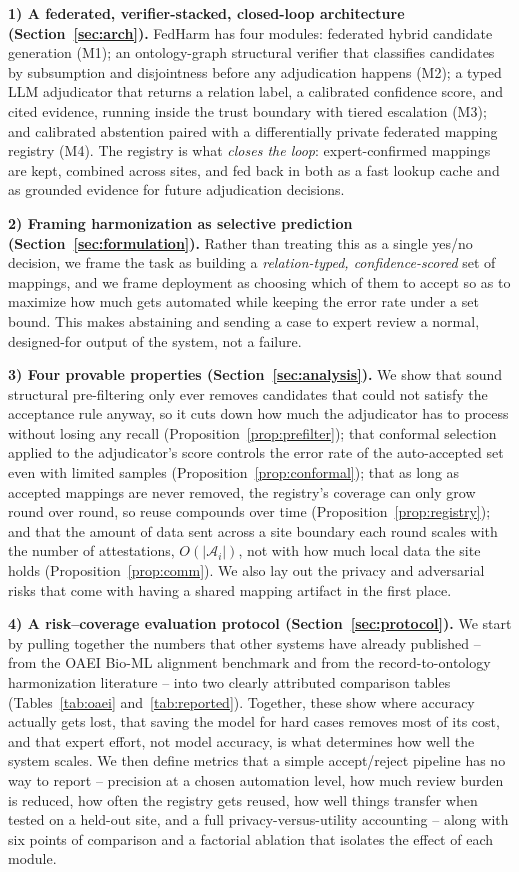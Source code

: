 \documentclass[conference]{IEEEtran}
\newcommand{\att}{\mathcal{A}}
\begin{document}
\textbf{1) A federated, verifier-stacked, closed-loop architecture (Section~\ref{sec:arch}).} FedHarm has four modules: federated hybrid candidate generation (M1); an ontology-graph structural verifier that classifies candidates by subsumption and disjointness before any adjudication happens (M2); a typed LLM adjudicator that returns a relation label, a calibrated confidence score, and cited evidence, running inside the trust boundary with tiered escalation (M3); and calibrated abstention paired with a differentially private federated mapping registry (M4). The registry is what \emph{closes the loop}: expert-confirmed mappings are kept, combined across sites, and fed back in both as a fast lookup cache and as grounded evidence for future adjudication decisions.

\textbf{2) Framing harmonization as selective prediction (Section~\ref{sec:formulation}).} Rather than treating this as a single yes/no decision, we frame the task as building a \emph{relation-typed, confidence-scored} set of mappings, and we frame deployment as choosing which of them to accept so as to maximize how much gets automated while keeping the error rate under a set bound. This makes abstaining and sending a case to expert review a normal, designed-for output of the system, not a failure.

\textbf{3) Four provable properties (Section~\ref{sec:analysis}).} We show that sound structural pre-filtering only ever removes candidates that could not satisfy the acceptance rule anyway, so it cuts down how much the adjudicator has to process without losing any recall (Proposition~\ref{prop:prefilter}); that conformal selection applied to the adjudicator's score controls the error rate of the auto-accepted set even with limited samples (Proposition~\ref{prop:conformal}); that as long as accepted mappings are never removed, the registry's coverage can only grow round over round, so reuse compounds over time (Proposition~\ref{prop:registry}); and that the amount of data sent across a site boundary each round scales with the number of attestations, $O(|\att_i|)$, not with how much local data the site holds (Proposition~\ref{prop:comm}). We also lay out the privacy and adversarial risks that come with having a shared mapping artifact in the first place.

\textbf{4) A risk--coverage evaluation protocol (Section~\ref{sec:protocol}).} We start by pulling together the numbers that other systems have already published -- from the OAEI Bio-ML alignment benchmark and from the record-to-ontology harmonization literature -- into two clearly attributed comparison tables (Tables~\ref{tab:oaei} and~\ref{tab:reported}). Together, these show where accuracy actually gets lost, that saving the model for hard cases removes most of its cost, and that expert effort, not model accuracy, is what determines how well the system scales. We then define metrics that a simple accept/reject pipeline has no way to report -- precision at a chosen automation level, how much review burden is reduced, how often the registry gets reused, how well things transfer when tested on a held-out site, and a full privacy-versus-utility accounting -- along with six points of comparison and a factorial ablation that isolates the effect of each module.
\end{document}
